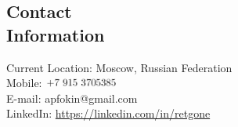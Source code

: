 \documentclass[margin,line]{CV}
\begin{document}
\begin{resume}


    \section{\mysidestyle Contact\\Information}
    Current Location: Moscow, Russian Federation \\
    Mobile: \includegraphics[height=0.35cm]{phone-ru.png} \\ 
    E-mail: apfokin@gmail.com \\
    LinkedIn: \url{https://linkedin.com/in/retgone}


    


\end{resume}
\end{document}
